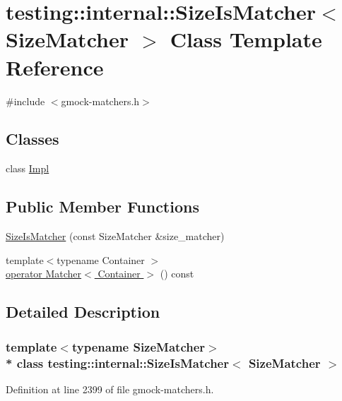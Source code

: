 \hypertarget{classtesting_1_1internal_1_1_size_is_matcher}{}\section{testing\+:\+:internal\+:\+:Size\+Is\+Matcher$<$ Size\+Matcher $>$ Class Template Reference}
\label{classtesting_1_1internal_1_1_size_is_matcher}


{\ttfamily \#include $<$gmock-\/matchers.\+h$>$}

\subsection*{Classes}
\begin{DoxyCompactItemize}
\item 
class \hyperlink{classtesting_1_1internal_1_1_size_is_matcher_1_1_impl}{Impl}
\end{DoxyCompactItemize}
\subsection*{Public Member Functions}
\begin{DoxyCompactItemize}
\item 
\hyperlink{classtesting_1_1internal_1_1_size_is_matcher_ab6a4e770fe9c1f6d07ef8bf0bc996d5d}{Size\+Is\+Matcher} (const Size\+Matcher \&size\+\_\+matcher)
\item 
{\footnotesize template$<$typename Container $>$ }\\\hyperlink{classtesting_1_1internal_1_1_size_is_matcher_aef58e7d3565decbe20abc227217d2514}{operator Matcher$<$ Container $>$} () const 
\end{DoxyCompactItemize}


\subsection{Detailed Description}
\subsubsection*{template$<$typename Size\+Matcher$>$\\*
class testing\+::internal\+::\+Size\+Is\+Matcher$<$ Size\+Matcher $>$}



Definition at line 2399 of file gmock-\/matchers.\+h.



